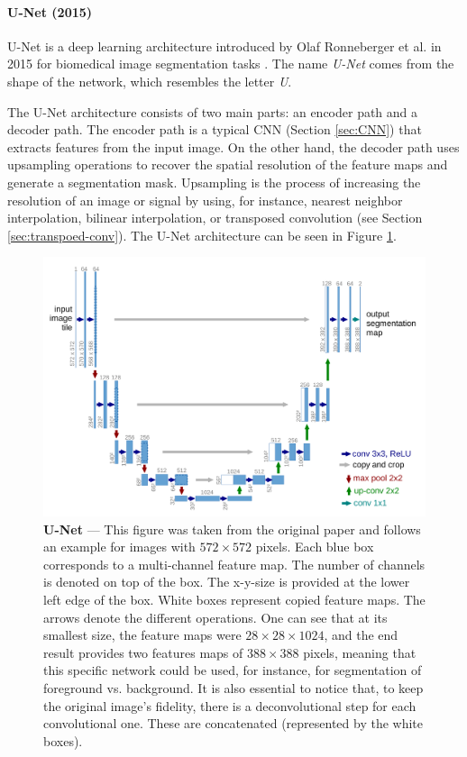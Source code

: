 \paragraph{U-Net (2015)}\label{sec:u-net}

U-Net is a deep learning architecture introduced by Olaf Ronneberger et al. in 2015 for biomedical image segmentation tasks \cite{ronneberger_u-net_2015}. The name \textit{U-Net} comes from the shape of the network, which resembles the letter \textit{U}.

The U-Net architecture consists of two main parts: an encoder path and a decoder path. The encoder path is a typical \ac{CNN} (Section \ref{sec:CNN}) that extracts features from the input image. On the other hand, the decoder path uses upsampling operations to recover the spatial resolution of the feature maps and generate a segmentation mask. Upsampling is the process of increasing the resolution of an image or signal by using, for instance, nearest neighbor interpolation, bilinear interpolation, or transposed convolution (see Section \ref{sec:transpoed-conv}). The U-Net architecture can be seen in Figure \ref{fig:u-net}.

\begin{figure}[ht]
    \centering
    \includegraphics[width=\textwidth]{figures/2-sota/u-net/u-net.png}
    \caption[U-Net]{\textbf{U-Net} --- This figure was taken from the original paper and follows an example for images with $572 \times 572$ pixels. Each blue box corresponds to a multi-channel feature map. The number of channels is denoted on top of the box. The x-y-size is provided at the lower left edge of the box. White boxes represent copied feature maps. The arrows denote the different operations. One can see that at its smallest size, the feature maps were $28 \times 28 \times 1024$, and the end result provides two features maps of $388 \times 388$ pixels, meaning that this specific network could be used, for instance, for segmentation of foreground vs. background. It is also essential to notice that, to keep the original image's fidelity, there is a deconvolutional step for each convolutional one. These are concatenated (represented by the white boxes).}
    \label{fig:u-net}
\end{figure}

